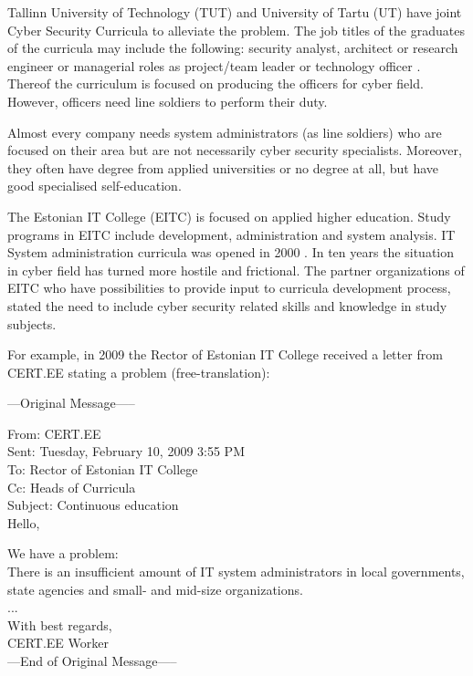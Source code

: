 Tallinn University of Technology (\gls{TUT}) and University of Tartu (\gls{UT}) have joint Cyber Security Curricula to alleviate the problem. The job titles of the graduates of the curricula may include the following: security analyst, architect or research engineer or managerial roles as project/team leader or technology officer \citep{TUT_UT_curriculum}. Thereof the curriculum is focused on producing the officers for cyber field. 
However, officers need line soldiers to perform their duty.

Almost every company needs system administrators (as line soldiers) who are focused on their area but are not necessarily cyber security specialists. Moreover, they often have degree from applied universities or no degree at all, but have good specialised self-education.

The Estonian IT College (\gls{EITC}) is focused on applied higher education. Study programs in \gls{EITC} include development, administration and system analysis. IT System administration curricula was opened in 2000 \citep{website:EITC_history}. In ten years the situation in cyber field has turned more hostile and frictional. The partner organizations of \gls{EITC} who have possibilities to provide input to curricula development process, stated the need to include cyber security related skills and knowledge in study subjects.

For example, in 2009 the Rector of Estonian IT College received a letter from \gls{CERT.EE} stating a problem (free-translation):\par

{
\begin{spacing}{1} 
\scriptsize
---Original Message-----

From: CERT.EE\\
Sent: Tuesday, February 10, 2009 3:55 PM\\
To: Rector of Estonian IT College\\
Cc: Heads of Curricula \\
Subject: Continuous education\\
Hello,

We have a problem:\\
There is an insufficient amount of IT system administrators in local governments, state agencies and small- and mid-size organizations.\\
...\\
With best regards,\\
CERT.EE Worker\\
---End of Original Message-----
\end{spacing}
}

